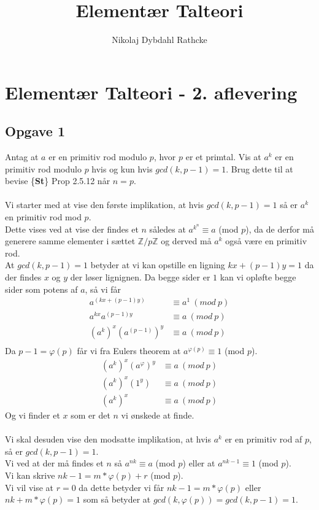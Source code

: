 \documentclass[12pt]{article}
\title{Elementær Talteori}
\author{Nikolaj Dybdahl Rathcke}
\begin{document}
\section*{Elementær Talteori - 2. aflevering}

\subsection*{Opgave 1}
Antag at $a$ er en primitiv rod modulo $p$, hvor $p$ er et primtal. Vis at $a^k$ er en primitiv rod modulo $p$ hvis og kun hvis $gcd(k, p-1) = 1$. Brug dette til at bevise \{\textbf{St}\} Prop 2.5.12 når $n=p$.\\
\\
Vi starter med at vise den første implikation, at hvis $gcd(k,p-1)=1$ så er $a^k$ en primitiv rod mod $p$.\\
Dette vises ved at vise der findes et $n$ således at $a^{k^n}\equiv a$ (mod $p$), da de derfor må generere samme elementer i sættet $\mathbb{Z}/p\mathbb{Z}$ og derved må $a^k$ også være en primitiv rod.\\
At $gcd(k,p-1)=1$ betyder at vi kan opstille en ligning $kx+(p-1)y=1$ da der findes  $x$ og $y$ der løser lignignen. Da begge sider er $1$ kan vi opløfte begge sider som potens af $a$, så vi får
\begin{align*}
a^{(kx+(p-1)y)}& \equiv a^1 \:(mod\:p)\\
a^{kx}a^{(p-1)y}& \equiv a \:(mod\:p) \\
(a^k)^x(a^{(p-1)})^y& \equiv a \:(mod\:p) \\
\end{align*}
Da $p-1=\varphi(p)$ får vi fra Eulers theorem at $a^{\varphi (p)}\equiv 1$ (mod $p$).
\begin{align*}
(a^k)^x(a^{\varphi})^y&\equiv a \:(mod\:p)  \\
(a^k)^x(1^y)&\equiv a \:(mod\:p)  \\
(a^k)^x&\equiv a \:(mod\:p) 
\end{align*}
Og vi finder et $x$ som er det $n$ vi ønskede at finde.\\
\\
Vi skal desuden vise den modsatte implikation, at hvis $a^k$ er en primitiv rod af $p$, så er $gcd(k,p-1)=1$.\\
Vi ved at der må findes et $n$ så $a^{nk}\equiv a$ (mod $p$) eller at $a^{nk-1}\equiv 1$ (mod $p$).\\
Vi kan skrive $nk-1=m*\varphi(p)+r$ (mod $p$).\\
Vi vil vise at $r=0$ da dette betyder vi får $nk-1=m*\varphi(p)$ eller $nk+m*\varphi(p)=1$ som så betyder at $gcd(k,\varphi(p))=gcd(k,p-1)=1$.\\
\end{document}
